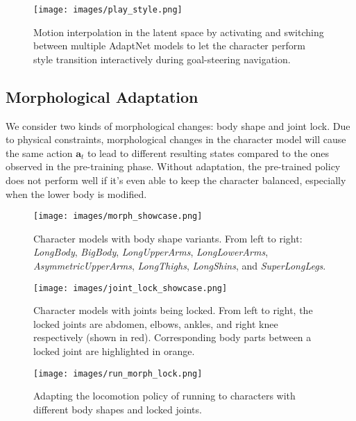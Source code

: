 \begin{figure*}[t]
   \centering\vspace{10pt}
   \texttt{[image: images/play\_style.png]}
   \caption{Motion interpolation in the latent space by activating and switching between multiple AdaptNet models to let the character perform style transition interactively during goal-steering navigation. %
   }
   \label{fig:style_interp_interactive}
\end{figure*}

\subsection{Morphological Adaptation}
We consider two kinds of morphological changes:
body shape %
and joint lock.
Due to physical constraints,
morphological changes in the character model will cause
the same action $\mathbf{a}_t$ to lead to different resulting states compared to the ones observed in the pre-training phase.
Without adaptation, the pre-trained policy does not perform well if it's even able to keep the character balanced, %
especially when the lower body is modified.

\begin{figure}[t]
    \centering
    \texttt{[image: images/morph\_showcase.png]}
    \caption{Character models with body shape variants. From left to right: \textit{LongBody}, \textit{BigBody}, \textit{LongUpperArms}, \textit{LongLowerArms}, \textit{AsymmetricUpperArms}, \textit{LongThighs}, \textit{LongShins}, and \textit{SuperLongLegs}.}
    \label{fig:bodyshape_showcase}
\end{figure}
\begin{figure}[t]
    \centering
    \texttt{[image: images/joint\_lock\_showcase.png]}
    \caption{Character models with joints being locked. 
    From left to right, the locked joints are abdomen, elbows, ankles, and right knee respectively (shown in red).
    Corresponding body parts between a locked joint are highlighted in orange. %
    }
    \label{fig:jointlock_showcase}
\end{figure}
\begin{figure*}[t]
    



    
    \centering
    \texttt{[image: images/run\_morph\_lock.png]}
    \caption{Adapting the locomotion policy of running to characters with different body shapes and locked joints. 
    }
    \label{fig:morph}
\end{figure*}

